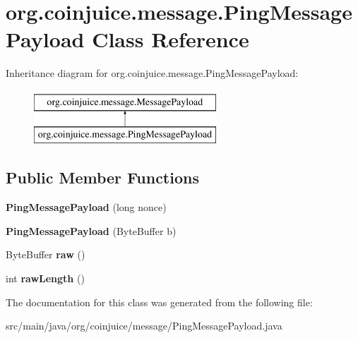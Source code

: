 \hypertarget{classorg_1_1coinjuice_1_1message_1_1_ping_message_payload}{\section{org.\-coinjuice.\-message.\-Ping\-Message\-Payload Class Reference}
\label{classorg_1_1coinjuice_1_1message_1_1_ping_message_payload}
}
Inheritance diagram for org.\-coinjuice.\-message.\-Ping\-Message\-Payload\-:\begin{figure}[H]
\begin{center}
\leavevmode
\includegraphics[height=2.000000cm]{classorg_1_1coinjuice_1_1message_1_1_ping_message_payload}
\end{center}
\end{figure}
\subsection*{Public Member Functions}
\begin{DoxyCompactItemize}
\item 
\hypertarget{classorg_1_1coinjuice_1_1message_1_1_ping_message_payload_a6429b61b5900fda35344306472633b1f}{{\bfseries Ping\-Message\-Payload} (long nonce)}\label{classorg_1_1coinjuice_1_1message_1_1_ping_message_payload_a6429b61b5900fda35344306472633b1f}

\item 
\hypertarget{classorg_1_1coinjuice_1_1message_1_1_ping_message_payload_aec436ef2b6c8fde4421174a4d3a69417}{{\bfseries Ping\-Message\-Payload} (Byte\-Buffer b)}\label{classorg_1_1coinjuice_1_1message_1_1_ping_message_payload_aec436ef2b6c8fde4421174a4d3a69417}

\item 
\hypertarget{classorg_1_1coinjuice_1_1message_1_1_ping_message_payload_aa938e94ba8115e93e91c69f2afc2ee1f}{Byte\-Buffer {\bfseries raw} ()}\label{classorg_1_1coinjuice_1_1message_1_1_ping_message_payload_aa938e94ba8115e93e91c69f2afc2ee1f}

\item 
\hypertarget{classorg_1_1coinjuice_1_1message_1_1_ping_message_payload_ac077c9e352e8f109f2ee83d489e4a080}{int {\bfseries raw\-Length} ()}\label{classorg_1_1coinjuice_1_1message_1_1_ping_message_payload_ac077c9e352e8f109f2ee83d489e4a080}

\end{DoxyCompactItemize}


The documentation for this class was generated from the following file\-:\begin{DoxyCompactItemize}
\item 
src/main/java/org/coinjuice/message/Ping\-Message\-Payload.\-java\end{DoxyCompactItemize}
